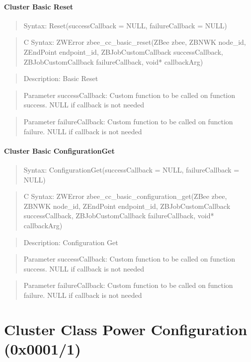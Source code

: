 \paragraph{Cluster Basic Reset}
\begin{quote}Syntax: Reset(successCallback = NULL, failureCallback = NULL)\end{quote}
\begin{quote}C Syntax: ZWError zbee\_cc\_basic\_reset(ZBee zbee, ZBNWK node\_id, ZEndPoint endpoint\_id, ZBJobCustomCallback successCallback, ZBJobCustomCallback failureCallback, void* callbackArg)\end{quote}
\begin{quote}Description: Basic Reset\end{quote}
\begin{quote}Parameter successCallback: Custom function to be called on function success. NULL if callback is not needed\end{quote}
\begin{quote}Parameter failureCallback: Custom function to be called on function failure. NULL if callback is not needed\end{quote}


\paragraph{Cluster Basic ConfigurationGet}
\begin{quote}Syntax: ConfigurationGet(successCallback = NULL, failureCallback = NULL)\end{quote}
\begin{quote}C Syntax: ZWError zbee\_cc\_basic\_configuration\_get(ZBee zbee, ZBNWK node\_id, ZEndPoint endpoint\_id, ZBJobCustomCallback successCallback, ZBJobCustomCallback failureCallback, void* callbackArg)\end{quote}
\begin{quote}Description: Configuration Get\end{quote}
\begin{quote}Parameter successCallback: Custom function to be called on function success. NULL if callback is not needed\end{quote}
\begin{quote}Parameter failureCallback: Custom function to be called on function failure. NULL if callback is not needed\end{quote}



\section{Cluster Class Power Configuration (0x0001/1)}

